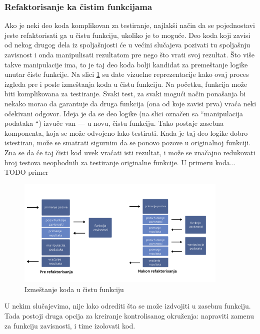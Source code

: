 \documentclass[12pt,oneside]{memoir}
\begin{document}
\subsubsection{Refaktorisanje ka čistim funkcijama} 
Ako je neki deo koda komplikovan za testiranje, najlakši način da se pojednostavi jeste refaktorisati ga u čistu funkciju, ukoliko je to moguće. Deo koda koji zavisi od nekog drugog dela iz spoljašnjosti će u većini slučajeva pozivati tu spoljašnju zavisnost i onda manipulisati rezultatom pre nego što vrati svoj rezultat. Što više takve manipulacije ima, to je taj deo koda bolji kandidat za premeštanje logike unutar čiste funkcije. Na slici \ref{fig:dep} su date vizuelne reprezentacije kako ovaj proces izgleda pre i posle izmeštanja koda u čistu funkciju. 
Na početku, funkcija može biti komplikovana za testiranje. Svaki test, za svaki mogući način ponašanja bi nekako morao da garantuje da druga funkcija (ona od koje zavisi prva) vraća neki očekivani odgovor. Ideja je da se deo logike (na slici označen sa ``manipulacija podataka ``) izvuče van --- u novu, čistu funkciju. Tako postaje zasebna komponenta, koja se može odvojeno lako testirati. Kada je taj deo logike dobro istestiran, može se smatrati sigurnim da se ponovo pozove u originalnoj funkciji. Zna se da će taj čisti kod uvek vraćati isti rezultat, i može se značajno redukovati broj testova neophodnih za testiranje originalne funkcije. U primeru koda... TODO primer

\begin{figure}[!ht]
  \centering
  \label{fig:dep}
  \includegraphics[width=0.9\textwidth]{dep.png}
  \caption{Izmeštanje koda u čistu funkciju}
\end{figure}

\par  U nekim slučajevima, nije lako odrediti šta se može izdvojiti u zasebnu funkciju. Tada postoji druga opcija za kreiranje kontrolisanog okruženja: napraviti zamenu za funkciju zavisnosti, i time izolovati kod. 
\end{document}
